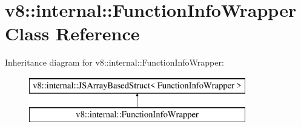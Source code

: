 \hypertarget{classv8_1_1internal_1_1_function_info_wrapper}{}\section{v8\+:\+:internal\+:\+:Function\+Info\+Wrapper Class Reference}
\label{classv8_1_1internal_1_1_function_info_wrapper}
Inheritance diagram for v8\+:\+:internal\+:\+:Function\+Info\+Wrapper\+:\begin{figure}[H]
\begin{center}
\leavevmode
\includegraphics[height=2.000000cm]{classv8_1_1internal_1_1_function_info_wrapper}
\end{center}
\end{figure}
